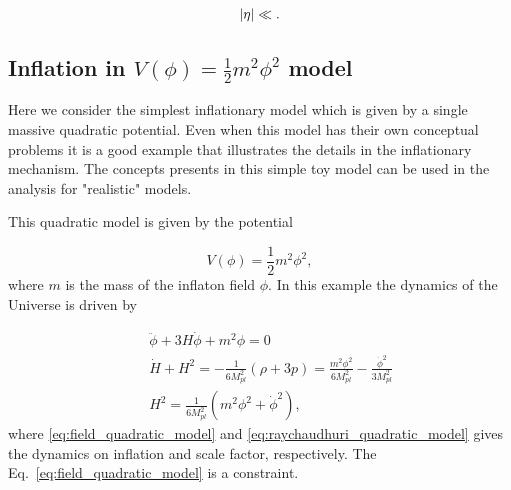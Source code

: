 \documentclass[12pt,letterpaper,twoside]{book}
\DeclarePairedDelimiter\abs{\lvert}{\rvert}%
\begin{document}
\begin{equation}
    \abs{\eta} \ll .
\end{equation}







\subsection{Inflation in $V(\phi)=\frac{1}{2}m^2\phi^2$ model}

Here we consider the simplest inflationary model which is given by a single
massive quadratic potential. Even when this model has their own conceptual
problems it is a good example that illustrates the details in the inflationary
mechanism. The concepts presents in this simple toy model can be used in the
analysis for "realistic" models.

This quadratic model is given by the potential

\begin{equation}
    V(\phi)=\frac{1}{2}m^2\phi^2,
\end{equation}
where $m$ is the mass of the inflaton field $\phi$. In this example the dynamics
of the Universe is driven by

\begin{eqnarray}
    \label{eq:field_quadratic_model}
        &&\ddot{\phi} + 3 H \dot{\phi} + m^2 \phi = 0 \\
    \label{eq:raychaudhuri_quadratic_model}
        &&\dot{H} + H^2 = - \frac{1}{6 M_{pl}^2} \left( \rho + 3 p \right)
                        =   \frac{m^2 \phi^2}{6 M_{pl}^2}
                          - \frac{\dot{\phi}^2}{3 M_{pl}^2}\\
    \label{eq:friedmann_quadratic_model}
        && H^2 = \frac{1}{6 M_{pl}^2} \left(m^2\phi^2+ \dot{\phi}^2\right),
\end{eqnarray}
where \eqref{eq:field_quadratic_model} and
\eqref{eq:raychaudhuri_quadratic_model} gives the dynamics on inflation and
scale factor, respectively. The Eq.~\eqref{eq:field_quadratic_model} is a
constraint.
\end{document}
